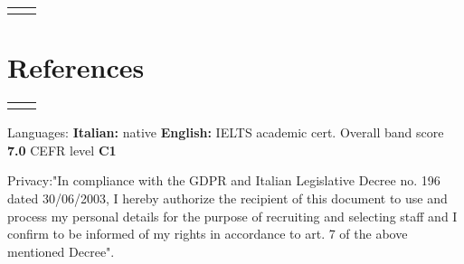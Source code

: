 \documentclass[
	10pt, %
]{FreemanCV}
\begin{document}
\begin{paracol}{2}
\begin{supertabular}{r l}

\end{supertabular}


\section{References}




\begin{supertabular}{r l} %
	
	
\end{supertabular}

\end{paracol} %

\textcolor{headings}{Languages:} \qquad \textbf{Italian:}  native \qquad
                                \textbf{English:}  IELTS academic cert. Overall band score \textbf{7.0} CEFR level \textbf{C1}
\smallskip

\textcolor{headings}{Privacy:}\quad"In compliance with the GDPR and Italian Legislative Decree no. 196 dated 30/06/2003, I hereby authorize the recipient of this document to use and process my personal details for the purpose of recruiting and selecting staff and I confirm to be informed of my rights in accordance to art. 7 of the above mentioned Decree".
\end{document}
